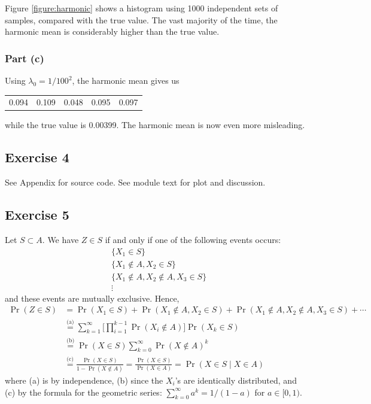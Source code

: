 \documentclass[12pt]{article}
\begin{document}
Figure \ref{figure:harmonic} shows a histogram using 1000 independent sets of samples, compared with the true value. The vast majority of the time, the harmonic mean is considerably higher than the true value.


\subsubsection*{Part (c)}
Using $\lambda_0 = 1/100^2$, the harmonic mean gives us
\begin{center}
\begin{tabular}{ccccc}
0.094 &
0.109 &
0.048 &
0.095 &
0.097 
\end{tabular}
\end{center}
while the true value is 0.00399. The harmonic mean is now even more misleading.



\subsection*{Exercise 4}
See Appendix for source code. See module text for plot and discussion.


\subsection*{Exercise 5}

Let $S\subset A$. We have $Z\in S$ if and only if one of the following events occurs:
\begin{align*}
&\{X_1\in S\}\\
&\{X_1\not\in A,X_2\in S\}\\
&\{X_1\not\in A,X_2\not\in A,X_3\in S\}\\
&\vdots
\end{align*}
and these events are mutually exclusive.  Hence, 
\begin{align*}
\Pr(Z\in S) & =\Pr(X_1\in S) +\Pr(X_1\not\in A,X_2\in S) +\Pr(X_1\not\in A,X_2\not\in A,X_3\in S)+\cdots\\
& \overset{\text{(a)}}{=} \sum_{k = 1}^\infty \Big[\prod_{i = 1}^{k-1} \Pr(X_i\not\in A)\Big]\Pr(X_k\in S)\\
& \overset{\text{(b)}}{=} \Pr(X\in S)\sum_{k = 0}^\infty \Pr(X\not\in A)^k\\
& \overset{\text{(c)}}{=} \frac{\Pr(X\in S)}{1-\Pr(X\not\in A)}
 = \frac{\Pr(X\in S)}{\Pr(X\in A)}
 = \Pr(X\in S\mid X\in A)
\end{align*}
where (a) is by independence, (b) since the $X_i$'s are identically distributed, and (c) by the formula for the geometric series: $\sum_{k = 0}^\infty a^k = 1/(1-a)$ for $a\in[0,1)$.
\end{document}
